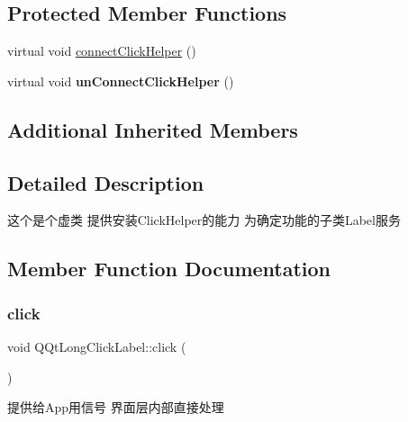 \subsection*{Protected Member Functions}
\begin{DoxyCompactItemize}
\item 
virtual void \mbox{\hyperlink{class_q_qt_long_click_label_a93794ed4256367fc15e5441a4424c595}{connect\+Click\+Helper}} ()
\item 
\mbox{\label{class_q_qt_long_click_label_abe5b6319017d0d3b6cbdb8e9019b3730}} 
virtual void {\bfseries un\+Connect\+Click\+Helper} ()
\end{DoxyCompactItemize}
\subsection*{Additional Inherited Members}


\subsection{Detailed Description}
这个是个虚类 提供安装\+Click\+Helper的能力 为确定功能的子类\+Label服务 

\subsection{Member Function Documentation}
\mbox{\label{class_q_qt_long_click_label_a4dd0fb87e6907f9f45162d95c8bd0d60}} 
\subsubsection{\texorpdfstring{click}{click}}
{\footnotesize\ttfamily void Q\+Qt\+Long\+Click\+Label\+::click (\begin{DoxyParamCaption}{ }\end{DoxyParamCaption})\hspace{0.3cm}{\ttfamily [signal]}}

提供给\+App用信号 界面层内部直接处理 \mbox{\label{class_q_qt_long_click_label_a93794ed4256367fc15e5441a4424c595}} 
